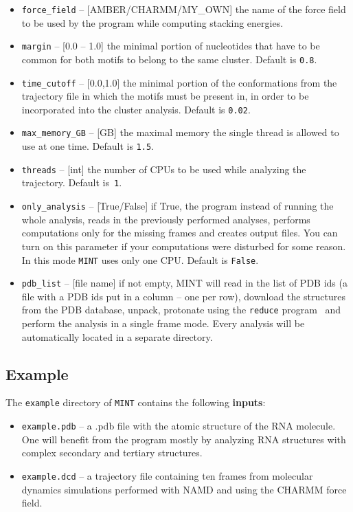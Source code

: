 \documentclass[12pt]{article}
\begin{document}
\begin{itemize}
\item \texttt{force\_field} --  [AMBER/CHARMM/MY\_OWN] the name of the force field to be used by the program while computing stacking energies.
\item \texttt{margin} -- [0.0 -- 1.0]  the minimal portion of nucleotides that have to be common for both motifs to belong to the same cluster. Default is \texttt{0.8}.
\item \texttt{time\_cutoff} -- [0.0,1.0] the minimal portion of the conformations from the trajectory file in which the motifs must be present in, in order to be incorporated into the cluster analysis. Default is \texttt{0.02}.
\item \texttt{max\_memory\_GB} -- [GB] the maximal memory the single thread is allowed to use at one time. Default is \texttt{1.5}.
\item \texttt{threads} -- [int] the number of CPUs to be used while analyzing  the trajectory. Default is~\texttt{1}.
\item \texttt{only\_analysis} -- [True/False] if True, the program instead of running the whole analysis, reads in the previously performed analyses, performs computations only for the missing frames and creates output files. You can turn on this parameter if your computations were disturbed for some reason. In this mode {\tt MINT} uses only one CPU. Default is {\tt False}.
\item \texttt{pdb\_list} -- [file name] if not empty, MINT will read in the list of PDB ids (a file with a PDB ids put in a column -- one per row), download the structures from the PDB database, unpack, protonate using the {\tt reduce} program~\cite{Word1999a} and perform the analysis in a single frame mode. Every analysis will be automatically located in a separate directory.
\end{itemize}

\subsection{Example} \label{Example_sec}
The {\tt example} directory of {\tt MINT} contains the following \textbf{inputs}:
\begin{itemize}
\item \texttt{example.pdb}  -- a .pdb file with the atomic structure of the RNA molecule. One will benefit from the program mostly by analyzing RNA structures with complex secondary and tertiary structures.
\item \texttt{example.dcd}  -- a trajectory file containing ten frames from molecular dynamics simulations performed with NAMD \cite{Phillips2005} and using the CHARMM force field.
\end{itemize}
\end{document}
